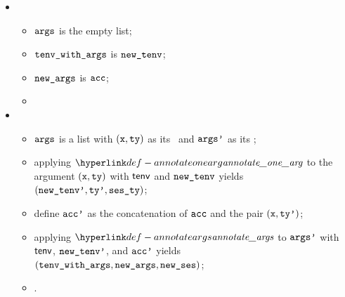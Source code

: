 \ProseParagraph
\OneApplies
\begin{itemize}
  \item {}
  \begin{itemize}
    \item $\texttt{args}$ is the empty list;
    \item $\texttt{tenv\_with\_args}$ is $\texttt{new\_tenv}$;
    \item $\texttt{new\_args}$ is $\texttt{acc}$;
    \item \Proseeqdef{$\vses$}{$\vsesin$}
  \end{itemize}

  \item {}
  \begin{itemize}
    \item $\texttt{args}$ is a list with $(\texttt{x}, \texttt{ty})$ as its \head\ and $\texttt{args'}$ as its \tail;
    \item applying $\annotateonearg$ to the argument $(\texttt{x}, \texttt{ty})$ with $\textsf{tenv}$ and $\texttt{new\_tenv}$ yields
          $(\texttt{new\_tenv'}, \texttt{ty'}, \texttt{ses\_ty})$\ProseOrTypeError;
    \item define $\texttt{acc'}$ as the concatenation of $\texttt{acc}$ and the pair $(\texttt{x}, \texttt{ty'})$;
    \item applying $\annotateargs$ to $\texttt{args'}$ with $\textsf{tenv}$, $\texttt{new\_tenv'}$, and $\texttt{acc'}$ yields\\
          $(\texttt{tenv\_with\_args}, \texttt{new\_args}, \texttt{new\_ses})$;
    \item {}.
  \end{itemize}
\end{itemize}

\FormallyParagraph
{}

